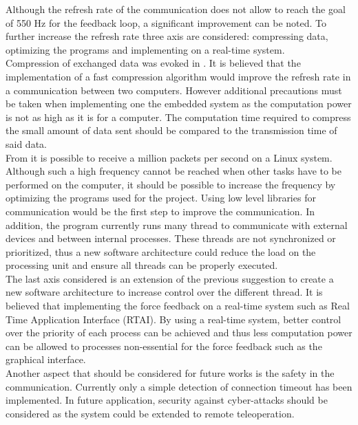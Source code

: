Although the refresh rate of the communication does not allow to reach the goal of 550 Hz for the feedback loop, a significant improvement can be noted.  To further increase the refresh rate three axis are considered: compressing data, optimizing the programs and implementing on a real-time system.\\
Compression of exchanged data was evoked in . It is believed that the implementation of a fast compression algorithm would improve the refresh rate in a communication between two computers. However additional precautions must be taken when implementing one the embedded system as the computation power is not as high as it is for a computer. The computation time required to compress the small amount of data sent should be compared to the transmission time of said data.\\
From \cite{million_packets} it is possible to receive a million packets per second on a Linux system. Although such a high frequency cannot be reached when other tasks have to be performed on the computer, it should be possible to increase the frequency by optimizing the programs used for the project. Using low level libraries for communication would be the first step to improve the communication. In addition, the program currently runs many thread to communicate with external devices and between internal processes. These threads are not synchronized or prioritized, thus a new software architecture could reduce the load on the processing unit and ensure all threads can be properly executed.\\
The last axis considered is an extension of the previous suggestion to create a new software architecture to increase control over the different thread. It is believed that implementing the force feedback on a real-time system such as Real Time Application Interface (RTAI). By using a real-time system, better control over the priority of each process can be achieved and thus less computation power can be allowed to processes non-essential for the force feedback such as the graphical interface.\\
Another aspect that should be considered for future works is the safety in the communication. Currently only a simple detection of connection timeout has been implemented. In future application, security against cyber-attacks should be considered as the system could be extended to remote teleoperation.
